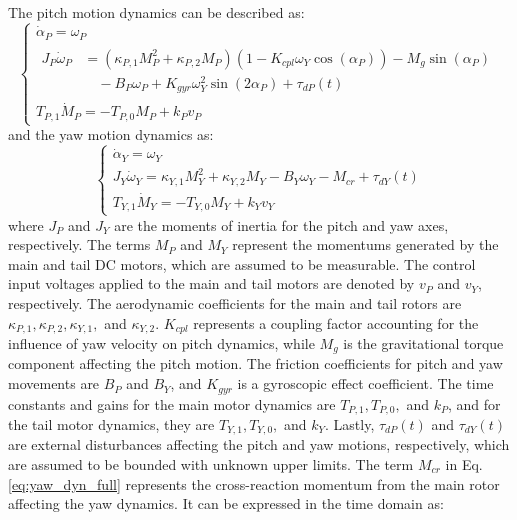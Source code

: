 The pitch motion dynamics can be described as:
\begin{equation}
    \label{eq:pitch_dyn_full}
    \begin{cases}
        \dot{\alpha}_P = \omega_P \\
        \begin{aligned}
            J_P \dot{\omega}_P &= (\kappa_{P,1} M_{P}^2 + \kappa_{P,2} M_{P})(1 - K_{cpl} \omega_Y \cos(\alpha_P)) - M_g \sin(\alpha_P) \\
            &\quad - B_P \omega_P + K_{gyr} \omega_Y^2 \sin(2\alpha_P) + \tau_{dP}(t)
        \end{aligned} \\
        T_{P,1} \dot{M}_{P} = -T_{P,0} M_{P} + k_P v_P
    \end{cases}
\end{equation}
and the yaw motion dynamics as:
\begin{equation}
    \label{eq:yaw_dyn_full}
    \begin{cases}
        \dot{\alpha}_Y = \omega_Y \\
        J_Y \dot{\omega}_Y = \kappa_{Y,1} M_{Y}^2 + \kappa_{Y,2} M_{Y} - B_Y \omega_Y - M_{cr} + \tau_{dY}(t) \\
        T_{Y,1} \dot{M}_{Y} = -T_{Y,0} M_{Y} + k_Y v_Y
    \end{cases}
\end{equation}
where $J_P$ and $J_Y$ are the moments of inertia for the pitch and yaw axes, respectively. The terms $M_{P}$ and $M_{Y}$ represent the momentums generated by the main and tail DC motors, which are assumed to be measurable. The control input voltages applied to the main and tail motors are denoted by $v_P$ and $v_Y$, respectively. The aerodynamic coefficients for the main and tail rotors are $\kappa_{P,1}, \kappa_{P,2}, \kappa_{Y,1},$ and $\kappa_{Y,2}$. $K_{cpl}$ represents a coupling factor accounting for the influence of yaw velocity on pitch dynamics, while $M_g$ is the gravitational torque component affecting the pitch motion. The friction coefficients for pitch and yaw movements are $B_P$ and $B_Y$, and $K_{gyr}$ is a gyroscopic effect coefficient. The time constants and gains for the main motor dynamics are $T_{P,1}, T_{P,0},$ and $k_P$, and for the tail motor dynamics, they are $T_{Y,1}, T_{Y,0},$ and $k_Y$. Lastly, $\tau_{dP}(t)$ and $\tau_{dY}(t)$ are external disturbances affecting the pitch and yaw motions, respectively, which are assumed to be bounded with unknown upper limits.
The term $M_{cr}$ in Eq. \eqref{eq:yaw_dyn_full} represents the cross-reaction momentum from the main rotor affecting the yaw dynamics. It can be expressed in the time domain as:
